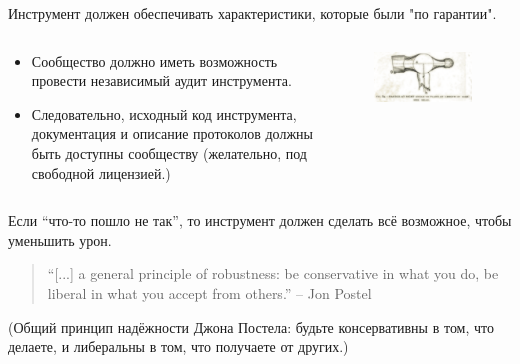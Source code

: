 \documentclass[presentation]{beamer}
\newcommand{\RaisedRightHand}{%
  \raisebox{-.50em}{\Large\HandRight}
}
\newcommand{\EndOfSectionOrnament}{
  \begin{center}
    \pgfornament[width=0.5\textwidth]{88}
    \end{center}
}
\begin{document}
\begin{frame}{}
  \RaisedRightHand Инструмент должен обеспечивать характеристики,
  которые были "по гарантии".\newline\newline

  \bigskip

  \begin{columns}
    \begin{column}{0.6\textwidth}
      \begin{itemize}
      \item Сообщество должно иметь возможность провести независимый аудит
        инструмента.
      \item Следовательно, исходный код инструмента, документация и
        описание протоколов должны быть доступны сообществу (желательно,
        под свободной лицензией.)
      \end{itemize}
    \end{column}
    \begin{column}{0.4\textwidth}
      \begin{figure}[]
        \centering
        \includegraphics[width=1.1\textwidth]{hammer-00}
      \end{figure}
    \end{column}
  \end{columns}
\end{frame}

\begin{frame}{}
  \raisebox{-.30em}{\Large\HandRight}\hspace{.25em} Если ``что-то
  пошло не так'', то инструмент должен сделать всё возможное, чтобы
  уменьшить урон.

  \bigskip

  \begin{quote}
    ``[...] a general principle of robustness: be conservative in what
    you do, be liberal in what you accept from others.'' -- Jon Postel
  \end{quote}

  \bigskip

  (Общий принцип надёжности Джона Постела: будьте консервативны в том,
  что делаете, и либеральны в том, что получаете от других.)

  \EndOfSectionOrnament
\end{frame}
\end{document}
